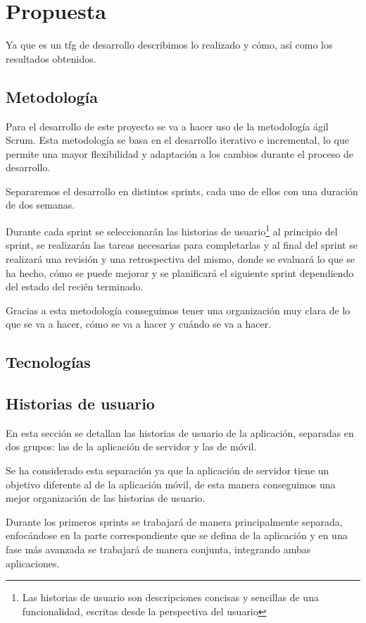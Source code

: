 \section{Propuesta}
Ya que es un tfg de desarrollo describimos lo realizado y cómo, así como los resultados obtenidos.

\subsection{Metodología}
Para el desarrollo de este proyecto se va a hacer uso de la metodología ágil Scrum. Esta metodología se basa en el desarrollo iterativo e incremental, lo que permite una mayor flexibilidad y adaptación a los cambios durante el proceso de desarrollo.

Separaremos el desarrollo en distintos sprints, cada uno de ellos con una duración de dos semanas.

Durante cada sprint se seleccionarán las historias de usuario\footnote{Las historias de usuario son descripciones concisas y sencillas de una funcionalidad, escritas desde la perspectiva del usuario} al principio del sprint, se realizarán las tareas necesarias para completarlas y al final del sprint se realizará una revisión y una retrospectiva del mismo, donde se evaluará lo que se ha hecho, cómo se puede mejorar y se planificará el siguiente sprint dependiendo del estado del recién terminado.

Gracias a esta metodología conseguimos tener una organización muy clara de lo que se va a hacer, cómo se va a hacer y cuándo se va a hacer.

\subsection{Tecnologías}

\subsection{Historias de usuario}
En esta sección se detallan las historias de usuario de la aplicación, separadas en dos grupos: las de la aplicación de servidor y las de móvil.

Se ha considerado esta separación ya que la aplicación de servidor tiene un objetivo diferente al de la aplicación móvil, de esta manera conseguimos una mejor organización de las historias de usuario.

Durante los primeros sprints se trabajará de manera principalmente separada, enfocándose en la parte correspondiente que se defina de la aplicación y en una fase más avanzada se trabajará de manera conjunta, integrando ambas aplicaciones.

